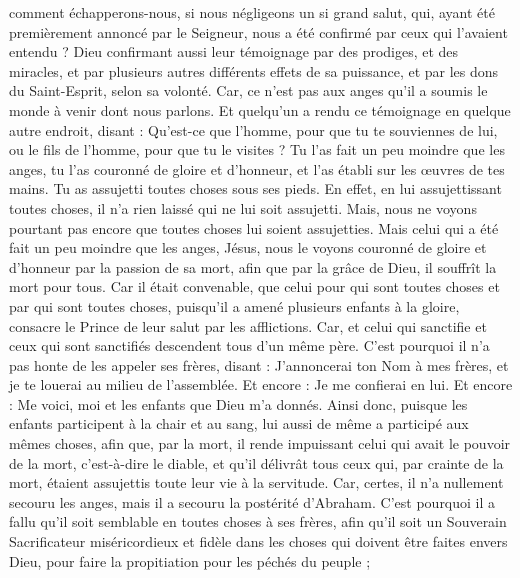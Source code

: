 \begin{multicols}{2}
comment échapperons-nous, si nous négligeons un si grand salut, qui, ayant été premièrement annoncé par le Seigneur, nous a été confirmé par ceux qui l'avaient entendu ?
Dieu confirmant aussi leur témoignage par des prodiges, et des miracles, et par plusieurs autres différents effets de sa puissance, et par les dons du Saint-Esprit, selon sa volonté.
Car, ce n'est pas aux anges qu'il a soumis le monde à venir dont nous parlons.
Et quelqu'un a rendu ce témoignage en quelque autre endroit, disant : Qu'est-ce que l'homme, pour que tu te souviennes de lui, ou le fils de l'homme, pour que tu le visites ?
Tu l'as fait un peu moindre que les anges, tu l'as couronné de gloire et d'honneur, et l'as établi sur les œuvres de tes mains.
Tu as assujetti toutes choses sous ses pieds. En effet, en lui assujettissant toutes choses, il n'a rien laissé qui ne lui soit assujetti. Mais, nous ne voyons pourtant pas encore que toutes choses lui soient assujetties.
Mais celui qui a été fait un peu moindre que les anges, Jésus, nous le voyons couronné de gloire et d'honneur par la passion de sa mort, afin que par la grâce de Dieu, il souffrît la mort pour tous.
Car il était convenable, que celui pour qui sont toutes choses et par qui sont toutes choses, puisqu'il a amené plusieurs enfants à la gloire, consacre le Prince de leur salut par les afflictions.
Car, et celui qui sanctifie et ceux qui sont sanctifiés descendent tous d'un même père. C'est pourquoi il n'a pas honte de les appeler ses frères,
disant : J'annoncerai ton Nom à mes frères, et je te louerai au milieu de l'assemblée.
Et encore : Je me confierai en lui. Et encore : Me voici, moi et les enfants que Dieu m'a donnés.
Ainsi donc, puisque les enfants participent à la chair et au sang, lui aussi de même a participé aux mêmes choses, afin que, par la mort, il rende impuissant celui qui avait le pouvoir de la mort, c'est-à-dire le diable,
et qu'il délivrât tous ceux qui, par crainte de la mort, étaient assujettis toute leur vie à la servitude.
Car, certes, il n'a nullement secouru les anges, mais il a secouru la postérité d'Abraham.
C'est pourquoi il a fallu qu'il soit semblable en toutes choses à ses frères, afin qu'il soit un Souverain Sacrificateur miséricordieux et fidèle dans les choses qui doivent être faites envers Dieu, pour faire la propitiation pour les péchés du peuple ;

\end{multicols}
